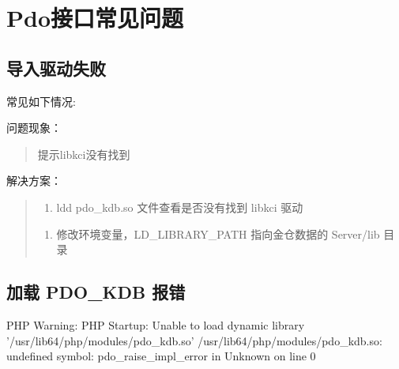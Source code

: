 \documentclass[a4,10pt,oneside,english]{sphinxmanual}
\begin{document}
\section{Pdo接口常见问题}
\label{\detokenize{interface/pdo:pdo}}\label{\detokenize{interface/pdo::doc}}

\subsection{导入驱动失败}
\label{\detokenize{interface/pdo:id1}}
常见如下情况:
\begin{quote}

\begin{figure}[H]
\centering

\noindent{}
\end{figure}
\end{quote}

问题现象：
\begin{quote}

提示libkci没有找到
\end{quote}

解决方案：
\begin{quote}
\begin{enumerate}
%
\item {} 
ldd pdo\_kdb.so 文件查看是否没有找到 libkci 驱动

\end{enumerate}

\begin{figure}[H]
\centering

\noindent{}
\end{figure}
\begin{enumerate}
%
\setcounter{enumi}{1}
\item {} 
修改环境变量，LD\_LIBRARY\_PATH 指向金仓数据的 Server/lib 目录

\end{enumerate}

\begin{sphinxVerbatim}[commandchars=\\\{\}]
 
\end{sphinxVerbatim}
\end{quote}


\subsection{加载 PDO\_KDB 报错}
\label{\detokenize{interface/pdo:pdo-kdb}}
PHP Warning:  PHP Startup: Unable to load dynamic library '/usr/lib64/php/modules/pdo\_kdb.so' \sphinxhyphen{} /usr/lib64/php/modules/pdo\_kdb.so: undefined symbol: pdo\_raise\_impl\_error in Unknown on line 0
\end{document}
